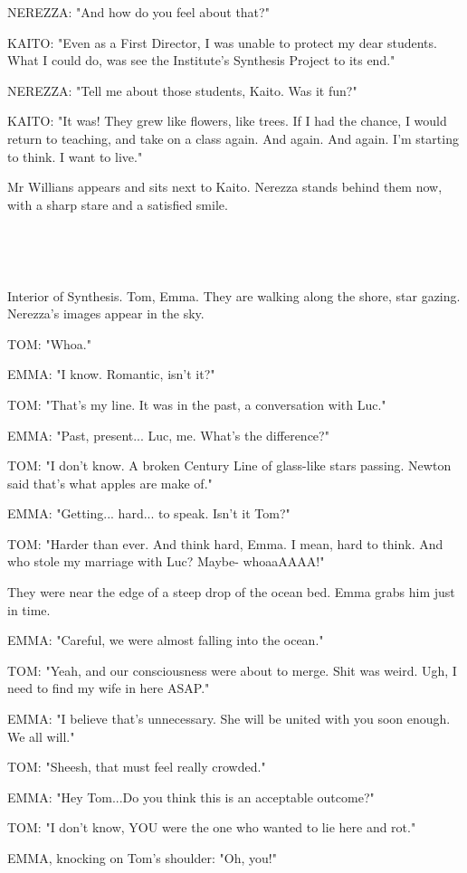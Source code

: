 \documentclass[11pt]{article}
\begin{document}
NEREZZA: "And how do you feel about that?"

KAITO: "Even as a First Director, I was unable to protect my dear students.
What I could do, was see the Institute's Synthesis Project to its end."

NEREZZA: "Tell me about those students, Kaito. Was it fun?"

KAITO: "It was! They grew like flowers, like trees.
If I had the chance, I would return to teaching, and take on a class again.
And again.
And again.
I'm starting to think.
I want to live."

Mr Willians appears and sits next to Kaito.
Nerezza stands behind them now, with a sharp stare and a satisfied smile.

\ 

\ 

Interior of Synthesis.
Tom, Emma.
They are walking along the shore, star gazing.
Nerezza's images appear in the sky.

TOM: "Whoa."

EMMA: "I know. Romantic, isn't it?"

TOM: "That's my line.
It was in the past, a conversation with Luc."

EMMA: "Past, present... Luc, me. What's the difference?"

TOM: "I don't know. 
A broken Century Line of glass-like stars passing.
Newton said that's what apples are make of."

EMMA: "Getting... hard... to speak. 
Isn't it Tom?"

TOM: "Harder than ever.
And think hard, Emma.
I mean, hard to think.
And who stole my marriage with Luc?
Maybe- whoaaAAAA!"

They were near the edge of a steep drop of the ocean bed. 
Emma grabs him just in time.

EMMA: "Careful, we were almost falling into the ocean."

TOM: "Yeah, and our consciousness were about to merge. 
Shit was weird.
Ugh, I need to find my wife in here ASAP."

EMMA: "I believe that's unnecessary. 
She will be united with you soon enough.
We all will."

TOM: "Sheesh, that must feel really crowded."

EMMA: "Hey Tom...Do you think this is an acceptable outcome?"

TOM: "I don't know, YOU were the one who wanted to lie here and rot."

EMMA, knocking on Tom's shoulder: "Oh, you!"
\end{document}
